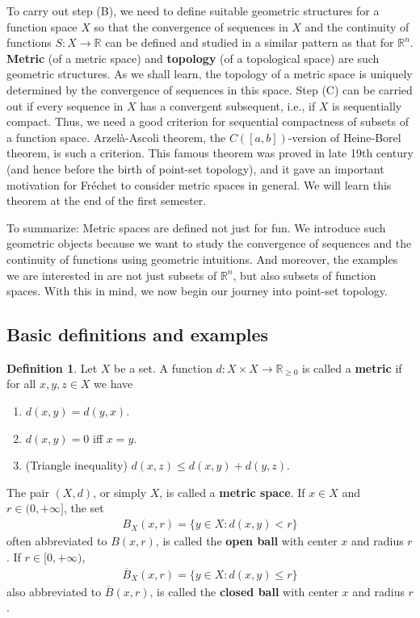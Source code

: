 \documentclass[12pt,b5paper,notitlepage]{article}
\theoremstyle{definition}
\newtheorem{df}{Definition}[section]
\theoremstyle{plain}
\newcommand{\ovl}{\overline}
\newcommand{\Rbb}{\mathbb R}
\numberwithin{equation}{section}
\begin{document}
To carry out step (B), we need to define suitable geometric structures for a function space $X$ so that the convergence of sequences in $X$ and the continuity of functions $S:X\rightarrow\Rbb$ can be defined and studied in a similar pattern as that for $\Rbb^n$. \textbf{Metric} (of a metric space) and \textbf{topology} (of a topological space) are such geometric structures. As we shall learn, the topology of a metric space is uniquely determined by the convergence of sequences in this space. Step (C) can be carried out if every sequence in $X$ has a convergent subsequent, i.e., if $X$ is sequentially compact. Thus, we need a good criterion for sequential compactness of subsets of a function space.  Arzel\`a-Ascoli theorem, the  $C([a,b])$-version of Heine-Borel theorem, is such a criterion. This famous theorem was proved in late 19th century (and hence before the birth of point-set topology), and it gave an important motivation for Fr\'echet to consider  metric spaces in general. We will learn this theorem at the end of the first semester.


To summarize: Metric spaces are defined not just for fun. We introduce such geometric objects because we want to study the convergence of sequences and the continuity of functions using geometric intuitions. And moreover, the examples we are interested in are not just subsets of $\Rbb^n$, but also subsets of function spaces. With this in mind, we now begin our journey into point-set topology.


\subsection{Basic definitions and examples}



\begin{df}
Let $X$ be a set. A function $d:X\times X\rightarrow\Rbb_{\geq0}$ is called a \textbf{metric} if for all $x,y,z\in X$ we have
\begin{enumerate}[label=(\arabic*)]
\item $d(x,y)=d(y,x)$.
\item $d(x,y)=0$ iff $x=y$.
\item (Triangle inequality)  $d(x,z)\leq d(x,y)+d(y,z)$.
\end{enumerate}
The pair $(X,d)$, or simply $X$, is called  a \textbf{metric space}. If $x\in X$ and $r\in(0,+\infty]$, the set \index{Br@$B_X(x,r)=B(x,r)$ and $\ovl B_X(x,r)=\ovl B(x,r)$}
\begin{align*}
B_X(x,r)=\{y\in X:d(x,y)<r\}
\end{align*}
often abbreviated to $B(x,r)$, is called the \textbf{open ball} with center $x$ and radius $r$. If $r\in[0,+\infty)$,
\begin{align*}
\ovl B_X(x,r)=\{y\in X:d(x,y)\leq r\}
\end{align*}
also abbreviated to $\ovl B(x,r)$, is called the \textbf{closed ball} with center $x$ and radius $r$.
\end{df}
\end{document}
